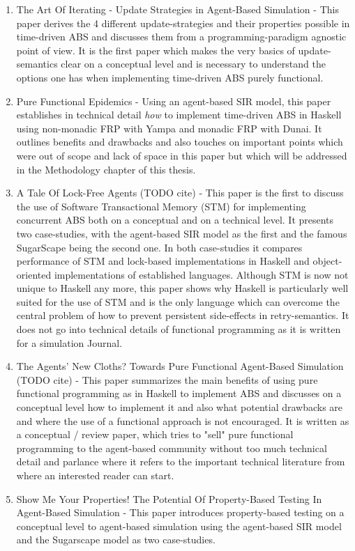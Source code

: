 \begin{enumerate}
	\item The Art Of Iterating - Update Strategies in Agent-Based Simulation \cite{thaler_art_2017} - This paper derives the 4 different update-strategies and their properties possible in time-driven ABS and discusses them from a programming-paradigm agnostic point of view. It is the first paper which makes the very basics of update-semantics clear on a conceptual level and is necessary to understand the options one has when implementing time-driven ABS purely functional.
	
	\item Pure Functional Epidemics \cite{thaler_pure_2018} - Using an agent-based SIR model, this paper establishes in technical detail \textit{how} to implement time-driven ABS in Haskell using non-monadic FRP with Yampa and monadic FRP with Dunai. It outlines benefits and drawbacks and also touches on important points which were out of scope and lack of space in this paper but which will be addressed in the Methodology chapter of this thesis.
	
	\item A Tale Of Lock-Free Agents (TODO cite) - This paper is the first to discuss the use of Software Transactional Memory (STM) for implementing concurrent ABS both on a conceptual and on a technical level. It presents two case-studies, with the agent-based SIR model as the first and the famous SugarScape being the second one. In both case-studies it compares performance of STM and lock-based implementations in Haskell and object-oriented implementations of established languages. Although STM is now not unique to Haskell any more, this paper shows why Haskell is particularly well suited for the use of STM and is the only language which can overcome the central problem of how to prevent persistent side-effects in retry-semantics. It does not go into technical details of functional programming as it is written for a simulation Journal.

	\item The Agents' New Cloths? Towards Pure Functional Agent-Based Simulation (TODO cite) - This paper summarizes the main benefits of using pure functional programming as in Haskell to implement ABS and discusses on a conceptual level how to implement it and also what potential drawbacks are and where the use of a functional approach is not encouraged. It is written as a conceptual / review paper, which tries to "sell" pure functional programming to the agent-based community without too much technical detail and parlance where it refers to the important technical literature from where an interested reader can start.
	
	\item Show Me Your Properties! The Potential Of Property-Based Testing In Agent-Based Simulation - This paper introduces property-based testing on a conceptual level to agent-based simulation using the agent-based SIR model and the Sugarscape model as two case-studies. 
\end{enumerate}
